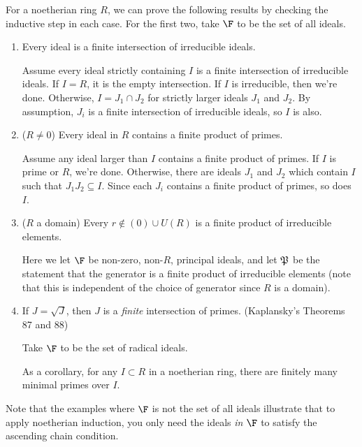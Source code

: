  \begin{example} For a noetherian ring $R$, we can prove the following results by
 checking the inductive step in each case. For the first two, take $\F$ to be the set of
 all ideals.
   \begin{enumerate}
     \item Every ideal is a finite intersection of irreducible ideals.

     Assume every ideal strictly containing $I$ is a finite intersection of irreducible
     ideals. If $I=R$, it is the empty intersection. If $I$ is irreducible, then we're
     done. Otherwise, $I = J_1\cap J_2$ for strictly larger ideals $J_1$ and $J_2$. By
     assumption, $J_i$ is a finite intersection of irreducible ideals, so $I$ is also.

     \item ($R\neq 0$) Every ideal in $R$ contains a finite product of primes.

     Assume any ideal larger than $I$ contains a finite product of primes. If $I$ is
     prime or $R$, we're done. Otherwise, there are ideals $J_1$ and $J_2$ which contain
     $I$ such that $J_1J_2\subseteq I$. Since each $J_i$ contains a finite product of
     primes, so does $I$.

     \item ($R$ a domain) Every $r\not\in (0)\cup U(R)$ is a finite product of
     irreducible elements.

     Here we let $\F$ be non-zero, non-$R$, principal ideals, and let $\P$ be the
     statement that the generator is a finite product of irreducible elements (note that
     this is independent of the choice of generator since $R$ is a domain). 

     \item If $J=\sqrt J$, then $J$ is a \emph{finite} intersection of primes.
     (Kaplansky's Theorems 87 and 88)

     Take $\F$ to be the set of radical ideals.

     As a corollary, for any $I\subset R$ in a noetherian ring, there are finitely many
     minimal primes over $I$.
   \end{enumerate}
   \vspace*{-1.7\baselineskip}
 \end{example}
 Note that the examples where $\F$ is not the set of all ideals illustrate that to
 apply noetherian induction, you only need the ideals \emph{in $\F$} to satisfy the
 ascending chain condition.
 \setcounter{lecture}{7}
